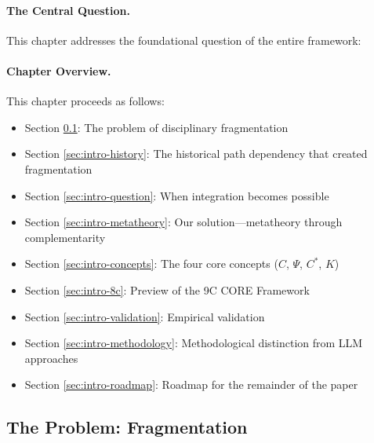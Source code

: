 \paragraph{The Central Question.}
This chapter addresses the foundational question of the entire framework:

\begin{center}
\end{center}

\paragraph{Chapter Overview.}
\label{sec:intro-overview}
This chapter proceeds as follows:
\begin{itemize}
    \item Section \ref{sec:intro-problem}: The problem of disciplinary fragmentation
    \item Section \ref{sec:intro-history}: The historical path dependency that created fragmentation
    \item Section \ref{sec:intro-question}: When integration becomes possible
    \item Section \ref{sec:intro-metatheory}: Our solution---metatheory through complementarity
    \item Section \ref{sec:intro-concepts}: The four core concepts ($C$, $\Psi$, $C^*$, $K$)
    \item Section \ref{sec:intro-8c}: Preview of the 9C CORE Framework
    \item Section \ref{sec:intro-validation}: Empirical validation
    \item Section \ref{sec:intro-methodology}: Methodological distinction from LLM approaches
    \item Section \ref{sec:intro-roadmap}: Roadmap for the remainder of the paper
\end{itemize}

\subsection{The Problem: Fragmentation}
\label{sec:intro-problem}

